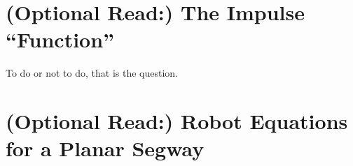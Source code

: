 \FloatBarrier

\section{(Optional Read:) The Impulse ``Function''}
\label{sec:UnitImpulse}

To do or not to do, that is the question.




\section{(Optional Read:) Robot Equations for a Planar Segway}
\label{sec:RobotEquationsPlanarSegway}












